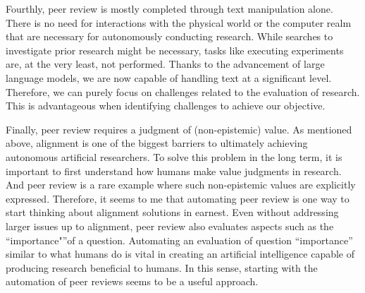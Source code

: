 


Fourthly, peer review is mostly completed through text manipulation alone. There is no need for interactions with the physical world or the computer realm that are necessary for autonomously conducting research. While searches to investigate prior research might be necessary, tasks like executing experiments are, at the very least, not performed. Thanks to the advancement of large language models, we are now capable of handling text at a significant level. Therefore, we can purely focus on challenges related to the evaluation of research. This is advantageous when identifying challenges to achieve our objective.


Finally, peer review requires a judgment of  (non-epistemic) value. As mentioned above, alignment is one of the biggest barriers to ultimately achieving autonomous artificial researchers. To solve this problem in the long term, it is important to first understand how humans make value judgments in research. And peer review is a rare example where such non-epistemic values are explicitly expressed. Therefore, it seems to me that automating peer review is one way to start thinking about alignment solutions in earnest. Even without addressing larger issues up to alignment, peer review also evaluates aspects such as the ``importance"''of a question. Automating an evaluation of question ``importance'' similar to what humans do is vital in creating an artificial intelligence capable of producing research beneficial to humans. In this sense, starting with the automation of peer reviews seems to be a useful approach.


